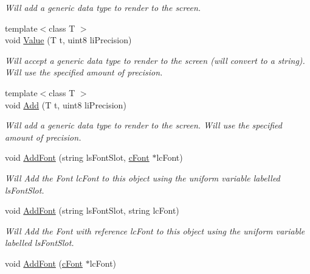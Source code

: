 \begin{DoxyCompactItemize}
\begin{DoxyCompactList}\small\item\em Will add a generic data type to render to the screen. \end{DoxyCompactList}\item 
\hypertarget{classc_text_a0f1c0a62d77c5c4879d181979b1d906d}{
{\footnotesize template$<$class T $>$ }\\void \hyperlink{classc_text_a0f1c0a62d77c5c4879d181979b1d906d}{Value} (T t, uint8 liPrecision)}
\label{classc_text_a0f1c0a62d77c5c4879d181979b1d906d}

\begin{DoxyCompactList}\small\item\em Will accept a generic data type to render to the screen (will convert to a string). Will use the specified amount of precision. \end{DoxyCompactList}\item 
\hypertarget{classc_text_adc344cacdb992ba7c9c1b0d63feb4c27}{
{\footnotesize template$<$class T $>$ }\\void \hyperlink{classc_text_adc344cacdb992ba7c9c1b0d63feb4c27}{Add} (T t, uint8 liPrecision)}
\label{classc_text_adc344cacdb992ba7c9c1b0d63feb4c27}

\begin{DoxyCompactList}\small\item\em Will add a generic data type to render to the screen. Will use the specified amount of precision. \end{DoxyCompactList}\item 
\hypertarget{classc_text_ac44668d1b105b37f62e5386ce9c62969}{
void \hyperlink{classc_text_ac44668d1b105b37f62e5386ce9c62969}{AddFont} (string lsFontSlot, \hyperlink{classc_font}{cFont} $\ast$lcFont)}
\label{classc_text_ac44668d1b105b37f62e5386ce9c62969}

\begin{DoxyCompactList}\small\item\em Will Add the Font lcFont to this object using the uniform variable labelled lsFontSlot. \end{DoxyCompactList}\item 
\hypertarget{classc_text_a9fa922feeb34018a9756ca2ef6f06fff}{
void \hyperlink{classc_text_a9fa922feeb34018a9756ca2ef6f06fff}{AddFont} (string lsFontSlot, string lcFont)}
\label{classc_text_a9fa922feeb34018a9756ca2ef6f06fff}

\begin{DoxyCompactList}\small\item\em Will Add the Font with reference lcFont to this object using the uniform variable labelled lsFontSlot. \end{DoxyCompactList}\item 
\hypertarget{classc_text_ae144cad4649fe01e6164c073b14b37ac}{
void \hyperlink{classc_text_ae144cad4649fe01e6164c073b14b37ac}{AddFont} (\hyperlink{classc_font}{cFont} $\ast$lcFont)}
\label{classc_text_ae144cad4649fe01e6164c073b14b37ac}


\end{DoxyCompactItemize}
